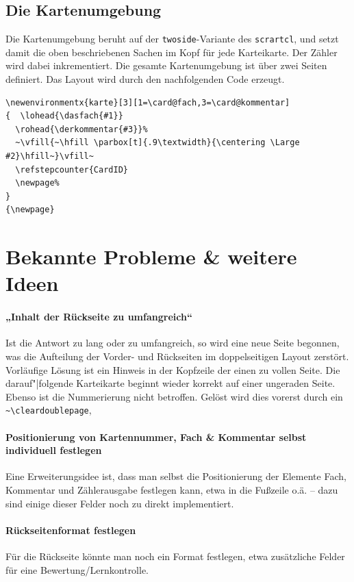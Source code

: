 \documentclass[a4paper,DIV=calc]{scrartcl}
\begin{document}
\subsection{Die Kartenumgebung}
Die Kartenumgebung beruht auf der \lstinline!twoside!-Variante des \lstinline!scrartcl!, und setzt damit die oben beschriebenen Sachen im Kopf für jede Karteikarte. Der Zähler wird dabei inkrementiert. Die gesamte Kartenumgebung ist über zwei Seiten definiert. Das Layout wird durch den nachfolgenden Code erzeugt.
\begin{lstlisting}[title=Die Kartenumgebung,float=h]
\newenvironmentx{karte}[3][1=\card@fach,3=\card@kommentar]
{  \lohead{\dasfach{#1}}
  \rohead{\derkommentar{#3}}%
  ~\vfill{~\hfill \parbox[t]{.9\textwidth}{\centering \Large #2}\hfill~}\vfill~
  \refstepcounter{CardID}
  \newpage%
}
{\newpage}
\end{lstlisting}
%
%
%
\section{Bekannte Probleme \& weitere Ideen}
\paragraph{„Inhalt der Rückseite zu umfangreich“} %
Ist die Antwort zu lang oder zu umfangreich, so wird eine neue Seite begonnen, was die Aufteilung der Vorder- und Rückseiten im doppelseitigen Layout zerstört. Vorläufige Lösung ist ein Hinweis in der Kopfzeile der einen zu vollen Seite. Die darauf"|folgende Karteikarte beginnt wieder korrekt auf einer ungeraden Seite. Ebenso ist die Nummerierung nicht betroffen. Gelöst wird dies vorerst durch ein \lstinline!~\cleardoublepage!, 

\paragraph{Positionierung von Kartennummer, Fach \& Kommentar selbst individuell festlegen}
Eine Erweiterungsidee ist, dass man selbst die Positionierung der Elemente Fach, Kommentar und Zählerausgabe festlegen kann, etwa in die Fußzeile o.ä. -- dazu sind einige dieser Felder noch zu direkt implementiert.

\paragraph{Rückseitenformat festlegen} 
Für die Rückseite könnte man noch ein Format festlegen, etwa zusätzliche Felder für eine Bewertung/Lernkontrolle.
\end{document}
